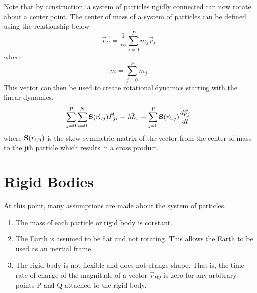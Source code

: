 \documentclass{article}
\begin{document}
Note that by construction, a system of particles rigidly connected can
now rotate about a center point. The center of mass of a system of
particles can be defined using the relationship below
\begin{equation}
\vec{r}_C = \frac{1}{m}\sum\limits_{j=0}^P m_j\vec{r}_{j}
\end{equation}
where
\begin{equation}
m = \sum\limits_{j=0}^P m_j
\end{equation}
This vector can then be used to create rotational dynamics starting
with the linear dynamics.
\begin{equation}
\sum\limits_{j=0}^P \sum\limits_{i=0}^N {\bf S}(\vec{r}_{Cj}) \vec{F}_{ji}  = \vec{M}_C = \sum\limits_{j=0}^P {\bf
  S}(\vec{r}_{Cj}) \frac{d\vec{p}_j}{dt}
\end{equation}
where ${\bf S}(\vec{r}_{Cj})$ is the skew symmetric matrix of the
vector from the center of mass to the jth particle which results in a cross product.
\section{Rigid Bodies}
At this point, many assumptions are made about the
system of particles.
\begin{enumerate}
\item The mass of each particle or rigid body is constant.
\item The Earth is assumed to be flat and not rotating. This allows
  the Earth to be used as an inertial frame.
\item The rigid body is not flexible and does not change shape. That
  is, the time rate of change of the magnitude of a vector
  $\vec{r}_{PQ}$ is zero for any arbitrary points P and Q attached to
  the rigid body.
\end{enumerate}
\end{document}
